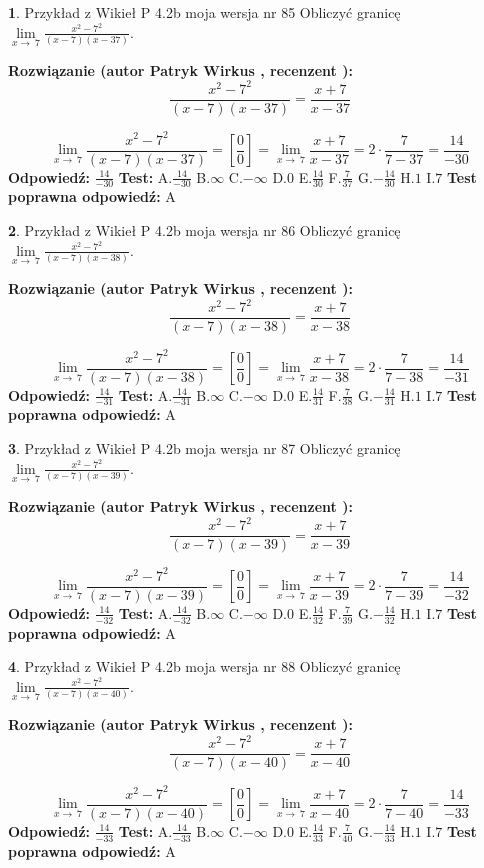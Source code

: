 \documentclass[12pt, a4paper]{article}
\theoremstyle{definition} %
\newtheorem{zad}{}
\newcommand{\zadStart}[1]{\begin{zad}#1\newline}
\newcommand{\zadStop}{\end{zad}}
\newcommand{\rozwStart}[2]{\noindent \textbf{Rozwiązanie (autor #1 , recenzent #2): }\newline}
\newcommand{\rozwStop}{\newline}
\newcommand{\odpStart}{\noindent \textbf{Odpowiedź:}\newline}
\newcommand{\odpStop}{\newline}
\newcommand{\testStart}{\noindent \textbf{Test:}\newline}
\newcommand{\testStop}{\newline}
\newcommand{\kluczStart}{\noindent \textbf{Test poprawna odpowiedź:}\newline}
\newcommand{\kluczStop}{\newline}
\begin{document}
\zadStart{Przykład z Wikieł P 4.2b moja wersja nr 85}
Obliczyć granicę $\lim\limits_{x\to\ 7}\frac{x^{2}-7^{2}}{(x-7)(x-37)}$.
\zadStop
\rozwStart{Patryk Wirkus}{}
$$\frac{x^{2}-7^{2}}{(x-7)(x-37)}=\frac{x+7}{x-37}$$

$$\lim\limits_{x\to\ 7}\frac{x^{2}-7^{2}}{(x-7)(x-37)}=[\frac{0}{0}]=\lim\limits_{x\to\ 7}\frac{x+7}{x-37}=2 \cdot \frac{7}{7-37} = \frac{14}{-30}$$
\rozwStop
\odpStart
$\frac{14}{-30}$
\odpStop
\testStart
A.$\frac{14}{-30}$
B.$\infty$
C.$-\infty$
D.$0$
E.$\frac{14}{30}$
F.$\frac{7}{37}$
G.$-\frac{14}{30}$
H.$1$
I.$7$
\testStop
\kluczStart
A
\kluczStop



\zadStart{Przykład z Wikieł P 4.2b moja wersja nr 86}
Obliczyć granicę $\lim\limits_{x\to\ 7}\frac{x^{2}-7^{2}}{(x-7)(x-38)}$.
\zadStop
\rozwStart{Patryk Wirkus}{}
$$\frac{x^{2}-7^{2}}{(x-7)(x-38)}=\frac{x+7}{x-38}$$

$$\lim\limits_{x\to\ 7}\frac{x^{2}-7^{2}}{(x-7)(x-38)}=[\frac{0}{0}]=\lim\limits_{x\to\ 7}\frac{x+7}{x-38}=2 \cdot \frac{7}{7-38} = \frac{14}{-31}$$
\rozwStop
\odpStart
$\frac{14}{-31}$
\odpStop
\testStart
A.$\frac{14}{-31}$
B.$\infty$
C.$-\infty$
D.$0$
E.$\frac{14}{31}$
F.$\frac{7}{38}$
G.$-\frac{14}{31}$
H.$1$
I.$7$
\testStop
\kluczStart
A
\kluczStop



\zadStart{Przykład z Wikieł P 4.2b moja wersja nr 87}
Obliczyć granicę $\lim\limits_{x\to\ 7}\frac{x^{2}-7^{2}}{(x-7)(x-39)}$.
\zadStop
\rozwStart{Patryk Wirkus}{}
$$\frac{x^{2}-7^{2}}{(x-7)(x-39)}=\frac{x+7}{x-39}$$

$$\lim\limits_{x\to\ 7}\frac{x^{2}-7^{2}}{(x-7)(x-39)}=[\frac{0}{0}]=\lim\limits_{x\to\ 7}\frac{x+7}{x-39}=2 \cdot \frac{7}{7-39} = \frac{14}{-32}$$
\rozwStop
\odpStart
$\frac{14}{-32}$
\odpStop
\testStart
A.$\frac{14}{-32}$
B.$\infty$
C.$-\infty$
D.$0$
E.$\frac{14}{32}$
F.$\frac{7}{39}$
G.$-\frac{14}{32}$
H.$1$
I.$7$
\testStop
\kluczStart
A
\kluczStop



\zadStart{Przykład z Wikieł P 4.2b moja wersja nr 88}
Obliczyć granicę $\lim\limits_{x\to\ 7}\frac{x^{2}-7^{2}}{(x-7)(x-40)}$.
\zadStop
\rozwStart{Patryk Wirkus}{}
$$\frac{x^{2}-7^{2}}{(x-7)(x-40)}=\frac{x+7}{x-40}$$

$$\lim\limits_{x\to\ 7}\frac{x^{2}-7^{2}}{(x-7)(x-40)}=[\frac{0}{0}]=\lim\limits_{x\to\ 7}\frac{x+7}{x-40}=2 \cdot \frac{7}{7-40} = \frac{14}{-33}$$
\rozwStop
\odpStart
$\frac{14}{-33}$
\odpStop
\testStart
A.$\frac{14}{-33}$
B.$\infty$
C.$-\infty$
D.$0$
E.$\frac{14}{33}$
F.$\frac{7}{40}$
G.$-\frac{14}{33}$
H.$1$
I.$7$
\testStop
\kluczStart
A
\kluczStop
\end{document}

